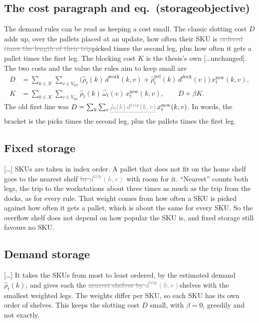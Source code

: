 \documentclass[11pt,a4paper]{article}
\newcommand{\new}[1]{\textcolor{newc}{#1}}
\newcommand{\old}[1]{\textcolor{gray}{\sout{#1}}}
\begin{document}
\subsection*{The cost paragraph and eq.~(storageobjective)}
The demand rules can be read as keeping a cost small. The classic slotting
cost $D$ adds up, over the pallets placed at an update, how often their SKU
is \old{ordered times the length of their trip}\new{picked times the second
leg, plus how often it gets a pallet times the first leg}. The blocking cost
$K$ is the thesis's own [\dots unchanged]. The two costs and the value the
rules aim to keep small are
\begin{align*}
D &= \sum_{k\in\mathcal{K}}\sum_{v\in V_{\mathrm{str}}}
  \bigl(\hat\rho_t(k)\,d^{\mathrm{work}}(k,v)+\hat\rho^{\mathrm{pal}}_t(k)\,d^{\mathrm{dock}}(v)\bigr)\,x^{\mathrm{new}}_t(k,v),\\
K &= \sum_{k\in\mathcal{K}}\sum_{v\in V_{\mathrm{str}}}
  \hat\rho_t(k)\,\hat\omega_t(v)\,x^{\mathrm{new}}_t(k,v),
  \qquad D+\beta K .
\end{align*}
The old first line was
$D=\sum_k\sum_v \old{\hat\rho_t(k)\,d^{\mathrm{trip}}(k,v)}\,x^{\mathrm{new}}_t(k,v)$.
\new{In words, the bracket is the picks times the second leg, plus the
pallets times the first leg.}

\subsection*{Fixed storage}
[\dots] SKUs are taken in index order. A pallet that does not fit on the home
shelf goes to the nearest shelf \old{by $d^{\mathrm{trip}}(k,v)$} with room
for it\new{. ``Nearest'' counts both legs, the trip to the workstations
about three times as much as the trip from the docks, as for every rule. That
weight comes from how often a SKU is picked against how often it gets a
pallet, which is about the same for every SKU. So the overflow shelf does not
depend on how popular the SKU is, and fixed storage still favours no SKU}.

\subsection*{Demand storage}
[\dots] It takes the SKUs from most to least ordered, by the estimated demand
$\hat\rho_t(k)$, and gives each the \old{nearest shelves by
$d^{\mathrm{trip}}(k,v)$}\new{shelves with the smallest weighted legs. The
weights differ per SKU, so each SKU has its own order of shelves}. This keeps
the slotting cost $D$ small, with $\beta=0$, greedily and not exactly.
\end{document}
